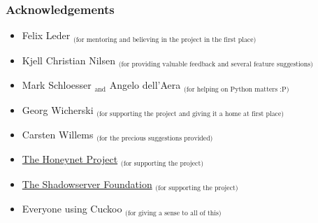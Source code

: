 \documentclass[letterpaper,10pt,english]{sphinxmanual}
\begin{document}
\subsubsection{Acknowledgements}
\label{finalremarks/index:acknowledgements}\begin{itemize}
\item {} 
Felix Leder $_{\text{(for mentoring and believing in the project in the first place)}}$

\item {} 
Kjell Christian Nilsen $_{\text{(for providing valuable feedback and several feature suggestions)}}$

\item {} 
Mark Schloesser $_{\text{and}}$ Angelo dell'Aera $_{\text{(for helping on Python matters :P)}}$

\item {} 
Georg Wicherski $_{\text{(for supporting the project and giving it a home at first place)}}$

\item {} 
Carsten Willems $_{\text{(for the precious suggestions provided)}}$

\item {} 
\href{http://www.honeynet.org}{The Honeynet Project} $_{\text{(for supporting the project)}}$

\item {} 
\href{http://www.shadowserver.org}{The Shadowserver Foundation} $_{\text{(for supporting the project)}}$

\item {} 
Everyone using Cuckoo $_{\text{(for giving a sense to all of this)}}$

\end{itemize}



\renewcommand{\indexname}{Index}
\printindex
\end{document}
